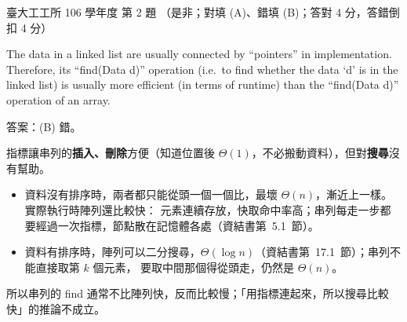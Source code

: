 \begin{pastexam}[label={px:ntu-106-ie-ds-02}]{臺大工工所 106 學年度 第 2 題}
（是非；對填 (A)、錯填 (B)；答對 4 分，答錯倒扣 4 分）

The data in a linked list are usually connected by ``pointers'' in implementation. Therefore, its
``find(Data d)'' operation (i.e.\ to find whether the data `d' is in the linked list) is usually more
efficient (in terms of runtime) than the ``find(Data d)'' operation of an array.
\end{pastexam}

\begin{pastsoln}
答案：(B) 錯。

指標讓串列的\textbf{插入、刪除}方便（知道位置後 $\Theta(1)$，不必搬動資料），但對\textbf{搜尋}沒有幫助。
\begin{itemize}
\item 資料沒有排序時，兩者都只能從頭一個一個比，最壞 $\Theta(n)$，漸近上一樣。 實際執行時陣列還比較快：
元素連續存放，快取命中率高；串列每走一步都要經過一次指標，節點散在記憶體各處（資結書第~5.1~節）。
\item 資料有排序時，陣列可以二分搜尋，$\Theta(\log n)$（資結書第~17.1~節）；串列不能直接取第 $k$ 個元素，
要取中間那個得從頭走，仍然是 $\Theta(n)$。
\end{itemize}
所以串列的 find 通常不比陣列快，反而比較慢；「用指標連起來，所以搜尋比較快」的推論不成立。
\end{pastsoln}
